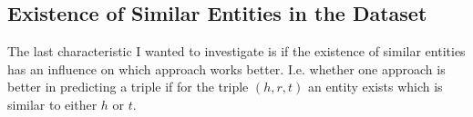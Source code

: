 \subsection{Existence of Similar Entities in the Dataset}
The last characteristic I wanted to investigate is if the existence of similar entities has an influence on which approach works better. I.e. whether one approach is better in predicting a triple if for the triple $(h,r,t)$ an entity exists which is similar to either $h$ or $t$.




